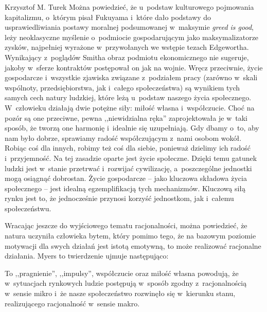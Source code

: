 \begin{artplenv}{Krzysztof M. Turek}
Można powiedzieć, że u~podstaw kulturowego pojmowania kapitalizmu, o~którym pisał Fukuyama i~które dało podstawy do
usprawiedliwiania postawy moralnej podsumowanej w~maksymie \textit{greed is good}, leży neoklasyczne
myślenie o~podmiocie gospodarującym jako maksymalizatorze zysków, najpełniej wyrażone w~przywołanych we wstępie
tezach Edgewortha. Wynikający z~poglądów Smitha obraz podmiotu ekonomicznego nie sugeruje,
jakoby w~sferze kontraktów postępował on jak na
wojnie. Wręcz przeciwnie, życie gospodarcze i~wszystkie zjawiska związane z~podziałem pracy (zarówno w~skali wspólnoty,
przedsiębiorstwa, jak i~całego społeczeństwa) są wynikiem tych samych cech natury ludzkiej, które leżą u~podstaw
naszego życia społecznego. W~człowieku działają dwie potężne siły: miłość własna i~współczucie. Choć na pozór są one
przeciwne, pewna ,,niewidzialna ręka'' zaprojektowała je w~taki sposób, że tworzą one harmonię i~idealnie się
uzupełniają. Gdy dbamy o~to, aby nam było dobrze, sprawiamy radość współczującym z~nami osobom wokół. Robiąc coś dla
innych, robimy też coś dla siebie, ponieważ dzielimy ich radość i~przyjemność. Na tej zasadzie oparte jest życie
społeczne. Dzięki temu gatunek ludzki jest w~stanie przetrwać i~rozwijać cywilizację, a~poszczególne jednostki mogą
osiągnąć dobrostan. Życie gospodarcze -- jako kluczowa składowa życia społecznego -- jest idealną egzemplifikacją tych
mechanizmów. Kluczową siłą rynku jest to, że jednocześnie przynosi korzyść jednostkom, jak i~całemu społeczeństwu.

Wracając jeszcze do wyjściowego tematu racjonalności, można powiedzieć, że natura uczyniła człowieka bytem, który pomimo
tego, że na bazowym poziomie motywacji dla swych działań jest istotą emotywną, to może realizować racjonalne działania.
Myers
\parencite*[s.~95]{myers_soul_1983}
to twierdzenie ujmuje następująco: 

To ,,pragnienie'', ,,impulsy'', współczucie oraz miłość własna powodują, że w~sytuacjach rynkowych ludzie postępują w~sposób
zgodny z~racjonalnością w~sensie mikro i~że nasze społeczeństwo rozwinęło się w~kierunku stanu, realizującego
racjonalność w~sensie makro.

\end{artplenv}
